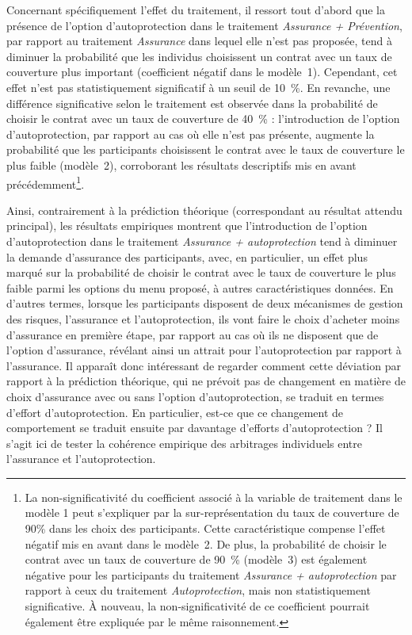 \begin{Article}
\begin{refsection}[Mouminoux]
Concernant spécifiquement l'effet du traitement, il ressort tout d'abord que la présence de l'option d'autoprotection dans le traitement \textit{Assurance + Prévention}, par rapport au traitement \textit{Assurance} dans lequel elle n'est pas proposée, tend à diminuer la probabilité que les individus choisissent un contrat avec un taux de couverture plus important (coefficient négatif dans le modèle~1). Cependant, cet effet n'est pas statistiquement significatif à un seuil de 10~\%. En revanche, une différence significative selon le traitement est observée dans la probabilité de choisir le contrat avec un taux de couverture de 40~\% : l'introduction de l'option d'autoprotection, par rapport au cas où elle n'est pas présente, augmente la probabilité que les participants choisissent le contrat avec le taux de couverture le plus faible (modèle~2), corroborant les résultats descriptifs mis en avant précédemment\footnote{La non-significativité du coefficient associé à la variable de traitement dans le modèle 1 peut s'expliquer par la sur-représentation du taux de couverture de 90\% dans les choix des participants. Cette caractéristique compense l'effet négatif mis en avant dans le modèle~2. De plus, la probabilité de choisir le contrat avec un taux de couverture de 90~\% (modèle~3) est également négative pour les participants du traitement \textit{Assurance + autoprotection} par rapport à ceux du traitement \textit{Autoprotection}, mais non statistiquement significative. À nouveau, la non-significativité de ce coefficient pourrait également être expliquée par le même raisonnement.}.

Ainsi, contrairement à la prédiction théorique (correspondant au résultat attendu principal), les résultats empiriques montrent que l'introduction de l'option d'autoprotection dans le traitement \textit{Assurance + autoprotection} tend à diminuer la demande d'assurance des participants, avec, en particulier, un effet plus marqué sur la probabilité de choisir le contrat avec le taux de couverture le plus faible parmi les options du menu proposé, à autres caractéristiques données. En d'autres termes, lorsque les participants disposent de deux mécanismes de gestion des risques, l'assurance et l'autoprotection, ils vont faire le choix d'acheter moins d'assurance en première étape, par rapport au cas où ils ne disposent que de l'option d'assurance, révélant ainsi un attrait pour l'autoprotection par rapport à l'assurance. Il apparaît donc intéressant de regarder comment cette déviation par rapport à la prédiction théorique, qui ne prévoit pas de changement en matière de choix d'assurance avec ou sans l'option d'autoprotection, se traduit en termes d'effort d'autoprotection. En particulier, est-ce que ce changement de comportement se traduit ensuite par davantage d'efforts d'autoprotection ? Il s'agit ici de tester la cohérence empirique des arbitrages individuels entre l'assurance et l'autoprotection.



\end{refsection}
\end{Article}
